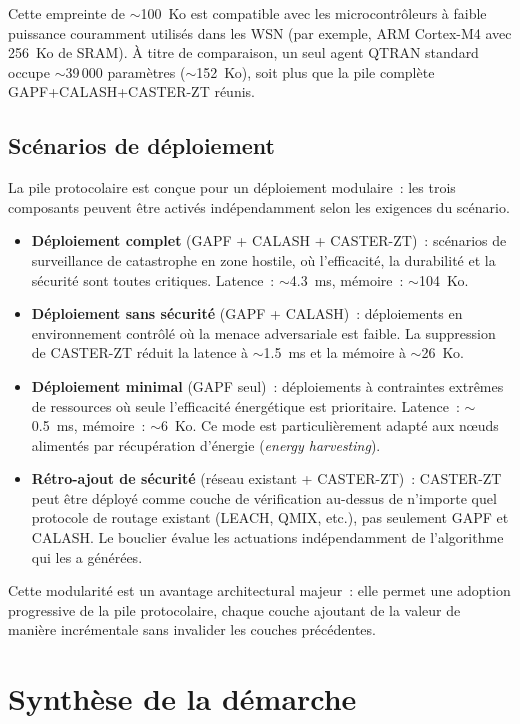 Cette empreinte de $\sim$100~Ko est compatible avec les microcontrôleurs à faible puissance couramment utilisés dans les WSN (par exemple, ARM Cortex-M4 avec 256~Ko de SRAM). À titre de comparaison, un seul agent QTRAN standard occupe $\sim$39\,000 paramètres ($\sim$152~Ko), soit plus que la pile complète GAPF+CALASH+CASTER-ZT réunis.

\subsection{Scénarios de déploiement}

La pile protocolaire est conçue pour un déploiement modulaire~: les trois composants peuvent être activés indépendamment selon les exigences du scénario.

\begin{itemize}
    \item \textbf{Déploiement complet} (GAPF + CALASH + CASTER-ZT)~: scénarios de surveillance de catastrophe en zone hostile, où l'efficacité, la durabilité et la sécurité sont toutes critiques. Latence~: $\sim$4.3~ms, mémoire~: $\sim$104~Ko.
    \item \textbf{Déploiement sans sécurité} (GAPF + CALASH)~: déploiements en environnement contrôlé où la menace adversariale est faible. La suppression de CASTER-ZT réduit la latence à $\sim$1.5~ms et la mémoire à $\sim$26~Ko.
    \item \textbf{Déploiement minimal} (GAPF seul)~: déploiements à contraintes extrêmes de ressources où seule l'efficacité énergétique est prioritaire. Latence~: $\sim$0.5~ms, mémoire~: $\sim$6~Ko. Ce mode est particulièrement adapté aux n\oe{}uds alimentés par récupération d'énergie (\emph{energy harvesting}).
    \item \textbf{Rétro-ajout de sécurité} (réseau existant + CASTER-ZT)~: CASTER-ZT peut être déployé comme couche de vérification au-dessus de n'importe quel protocole de routage existant (LEACH, QMIX, etc.), pas seulement GAPF et CALASH. Le bouclier évalue les actuations indépendamment de l'algorithme qui les a générées.
\end{itemize}

Cette modularité est un avantage architectural majeur~: elle permet une adoption progressive de la pile protocolaire, chaque couche ajoutant de la valeur de manière incrémentale sans invalider les couches précédentes.


\section{Synthèse de la démarche}

